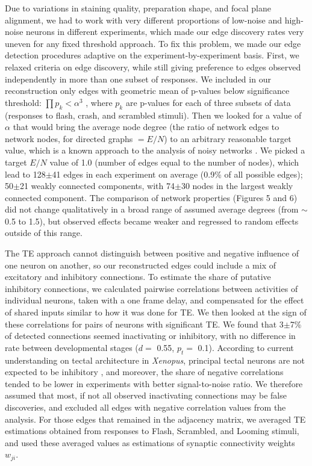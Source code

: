 \documentclass{article}
\begin{document}
Due to variations in staining quality, preparation shape, and focal plane alignment, we had to work with very different proportions of low-noise and high-noise neurons in different experiments, which made our edge discovery rates very uneven for any fixed threshold approach. To fix this problem, we made our edge detection procedures adaptive on the experiment-by-experiment basis. First, we relaxed criteria on edge discovery, while still giving preference to edges observed independently in more than one subset of responses. We included in our reconstruction only edges with geometric mean of p-values below significance threshold: $\prod{p_k}<\alpha^3$ , where $p_k$ are p-values for each of three subsets of data (responses to flash, crash, and scrambled stimuli). Then we looked for a value of $\alpha$ that would bring the average node degree (the ratio of network edges to network nodes, for directed graphs $=E/N$) to an arbitrary reasonable target value, which is a known approach to the analysis of noisy networks \citep{stetter2012te}. We picked a target $E/N$ value of 1.0 (number of edges equal to the number of nodes), which lead to 128$\pm$41 edges in each experiment on average (0.9\% of all possible edges); 50$\pm$21 weakly connected components, with 74$\pm$30 nodes in the largest weakly connected component. The comparison of network properties (Figures 5 and 6) did not change qualitatively in a broad range of assumed average degrees (from $\sim$ 0.5 to 1.5), but observed effects became weaker and regressed to random effects outside of this range. 

The TE approach cannot distinguish between positive and negative influence of one neuron on another, so our reconstructed edges could include a mix of excitatory and inhibitory connections. To estimate the share of putative inhibitory connections, we calculated pairwise correlations between activities of individual neurons, taken with a one frame delay, and compensated for the effect of shared inputs similar to how it was done for TE. We then looked at the sign of these correlations for pairs of neurons with significant TE. We found that 3$\pm$7\% of detected connections seemed inactivating or inhibitory, with no difference in rate between developmental stages ($d=$ 0.55, $p_t=$ 0.1). According to current understanding on tectal architecture in \textit{Xenopus}, principal tectal neurons are not expected to be inhibitory \citep{bell2011polyamines}, and moreover, the share of negative correlations tended to be lower in experiments with better signal-to-noise ratio. We therefore assumed that most, if not all observed inactivating connections may be false discoveries, and excluded all edges with negative correlation values from the analysis. For those edges that remained in the adjacency matrix, we averaged TE estimations obtained from responses to Flash, Scrambled, and Looming stimuli, and used these averaged values as estimations of synaptic connectivity weights $w_{ji}$.
\end{document}
